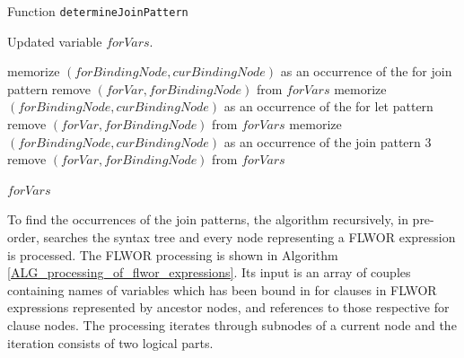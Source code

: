 \begin{algorithm}
\caption{Function \texttt{determineJoinPattern}}
\label{ALG_func_determineJoinPattern}
\begin{algorithmic}[1]

\ENSURE Updated variable $forVars$.

        \STATE memorize $(forBindingNode, curBindingNode)$ as an occurrence of the for join pattern
        \STATE remove $(forVar, forBindingNode)$ from $forVars$
        \STATE memorize $(forBindingNode, curBindingNode)$ as an occurrence of the for let pattern                
        \STATE remove $(forVar, forBindingNode)$ from $forVars$
    \ENDIF
{}
        \STATE memorize $(forBindingNode, curBindingNode)$ as an occurrence of the join pattern 3
        \STATE remove $(forVar, forBindingNode)$ from $forVars$
    \ENDIF
\ENDIF

\RETURN $forVars$
\end{algorithmic}
\end{algorithm}

To find the occurrences of the join patterns, the algorithm recursively, in pre-order, searches the syntax tree and every node representing a FLWOR expression is processed. The FLWOR processing is shown in Algorithm \ref{ALG_processing_of_flwor_expressions}. Its input is an array of couples containing names of variables which has been bound in for clauses in FLWOR expressions represented by ancestor nodes, and references to those respective for clause nodes. The processing iterates through subnodes of a current node and the iteration consists of two logical parts.

